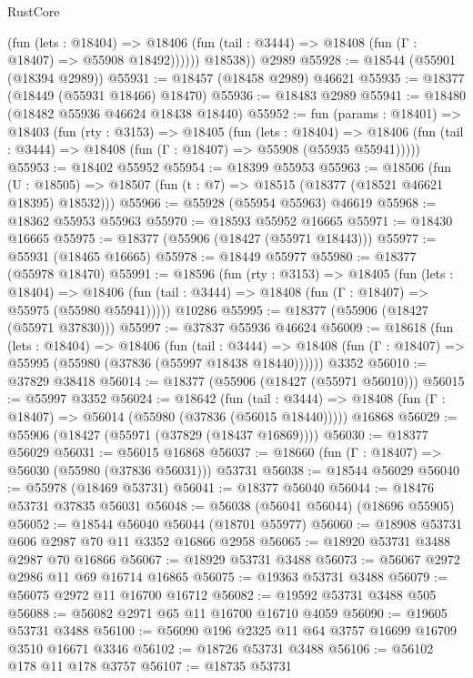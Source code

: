 \begin{lexlean}{RustCore}
\begin{coremodule}
              (fun (lets : @18404) =>
              @18406 (fun (tail : @3444) => @18408 (fun (Γ : @18407) => @55908 @18492))))))
        @18538))
    @2989
@55928 := @18544 (@55901 (@18394 @2989))
@55931 := @18457 (@18458 @2989) @46621
@55935 := @18377 (@18449 (@55931 @18466) @18470)
@55936 := @18483 @2989
@55941 := @18480 (@18482 @55936 @46624 @18438 @18440)
@55952 := fun (params : @18401) =>
  @18403
    (fun (rty : @3153) =>
    @18405
      (fun (lets : @18404) =>
      @18406 (fun (tail : @3444) => @18408 (fun (Γ : @18407) => @55908 (@55935 @55941)))))
@55953 := @18402 @55952
@55954 := @18399 @55953
@55963 := @18506
    (fun (U : @18505) => @18507 (fun (t : @7) => @18515 (@18377 (@18521 @46621 @18395) @18532)))
@55966 := @55928 (@55954 @55963) @46619
@55968 := @18362 @55953 @55963
@55970 := @18593 @55952 @16665
@55971 := @18430 @16665
@55975 := @18377 (@55906 (@18427 (@55971 @18443)))
@55977 := @55931 (@18465 @16665)
@55978 := @18449 @55977
@55980 := @18377 (@55978 @18470)
@55991 := @18596
    (fun (rty : @3153) =>
    @18405
      (fun (lets : @18404) =>
      @18406 (fun (tail : @3444) => @18408 (fun (Γ : @18407) => @55975 (@55980 @55941)))))
    @10286
@55995 := @18377 (@55906 (@18427 (@55971 @37830)))
@55997 := @37837 @55936 @46624
@56009 := @18618
    (fun (lets : @18404) =>
    @18406
      (fun (tail : @3444) =>
      @18408 (fun (Γ : @18407) => @55995 (@55980 (@37836 (@55997 @18438 @18440))))))
    @3352
@56010 := @37829 @38418
@56014 := @18377 (@55906 (@18427 (@55971 @56010)))
@56015 := @55997 @3352
@56024 := @18642
    (fun (tail : @3444) => @18408 (fun (Γ : @18407) => @56014 (@55980 (@37836 (@56015 @18440)))))
    @16868
@56029 := @55906 (@18427 (@55971 (@37829 (@18437 @16869))))
@56030 := @18377 @56029
@56031 := @56015 @16868
@56037 := @18660 (fun (Γ : @18407) => @56030 (@55980 (@37836 @56031))) @53731
@56038 := @18544 @56029
@56040 := @55978 (@18469 @53731)
@56041 := @18377 @56040
@56044 := @18476 @53731 @37835 @56031
@56048 := @56038 (@56041 @56044) (@18696 @55905)
@56052 := @18544 @56040 @56044 (@18701 @55977)
@56060 := @18908 @53731 @606 @2987 @70 @11 @3352 @16866 @2958
@56065 := @18920 @53731 @3488 @2987 @70 @16866
@56067 := @18929 @53731 @3488
@56073 := @56067 @2972 @2986 @11 @69 @16714 @16865
@56075 := @19363 @53731 @3488
@56079 := @56075 @2972 @11 @16700 @16712
@56082 := @19592 @53731 @3488 @505
@56088 := @56082 @2971 @65 @11 @16700 @16710 @4059
@56090 := @19605 @53731 @3488
@56100 := @56090 @196 @2325 @11 @64 @3757 @16699 @16709 @3510 @16671 @3346
@56102 := @18726 @53731 @3488
@56106 := @56102 @178 @11 @178 @3757
@56107 := @18735 @53731

\end{coremodule}
\end{lexlean}
